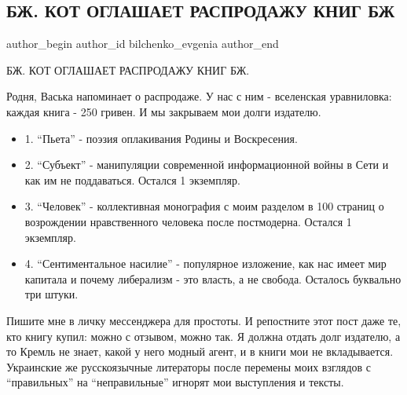  
 
 
 
 
 
\subsection{БЖ. КОТ ОГЛАШАЕТ РАСПРОДАЖУ КНИГ БЖ}
\label{sec:24_06_2021.fb.bilchenko_evgenia.7.rasprodazha_kot_knig}
\ifcmt
 author_begin
   author_id bilchenko_evgenia
 author_end
\fi

БЖ. КОТ ОГЛАШАЕТ РАСПРОДАЖУ КНИГ БЖ.

Родня, Васька напоминает о распродаже. У нас с ним - вселенская уравниловка:
каждая книга - 250 гривен. И мы закрываем мои долги издателю.

\begin{itemize}
\item 1. \enquote{Пьета} - поэзия оплакивания Родины и Воскресения.
\item 2. \enquote{Субъект} - манипуляции современной информационной войны в Сети и как им не поддаваться. Остался 1 экземпляр.
\item 3. \enquote{Человек} - коллективная монография с моим разделом в 100 страниц о возрождении нравственного человека после постмодерна. Остался 1 экземпляр.
\item 4. \enquote{Сентиментальное насилие} - популярное изложение, как нас имеет мир капитала
и почему либерализм - это власть, а не свобода. Осталось буквально три штуки.
\end{itemize}

Пишите мне в личку мессенджера для простоты. И репостните этот пост даже те,
кто книгу купил: можно с отзывом, можно так. Я должна отдать долг издателю, а
то Кремль не знает, какой у него модный агент, и в книги мои не вкладывается.
Украинские же русскоязычные литераторы после перемены моих взглядов с
\enquote{правильных} на \enquote{неправильные} игнорят мои выступления и тексты. 

